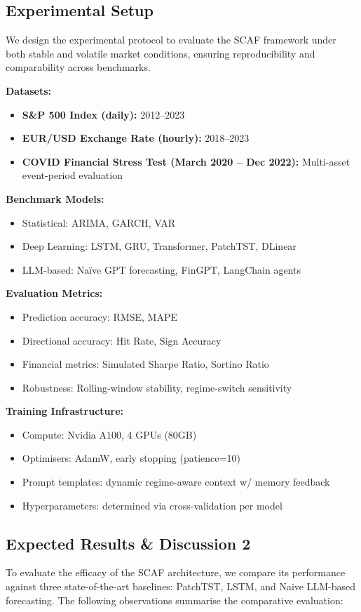\documentclass[conference]{IEEEtran}
\begin{document}
\subsection{Experimental Setup}
We design the experimental protocol to evaluate the SCAF framework under both stable and volatile market conditions, ensuring reproducibility and comparability across benchmarks.

\textbf{Datasets:}
\begin{itemize}
    \item \textbf{S\&P 500 Index (daily):} 2012–2023
    \item \textbf{EUR/USD Exchange Rate (hourly):} 2018–2023
    \item \textbf{COVID Financial Stress Test (March 2020 – Dec 2022):} Multi-asset event-period evaluation
\end{itemize}

\textbf{Benchmark Models:}
\begin{itemize}
    \item Statistical: ARIMA, GARCH, VAR
    \item Deep Learning: LSTM, GRU, Transformer, PatchTST, DLinear
    \item LLM-based: Naïve GPT forecasting, FinGPT, LangChain agents
\end{itemize}

\textbf{Evaluation Metrics:}
\begin{itemize}
    \item Prediction accuracy: RMSE, MAPE
    \item Directional accuracy: Hit Rate, Sign Accuracy
    \item Financial metrics: Simulated Sharpe Ratio, Sortino Ratio
    \item Robustness: Rolling-window stability, regime-switch sensitivity
\end{itemize}

\textbf{Training Infrastructure:}
\begin{itemize}
    \item Compute: Nvidia A100, 4 GPUs (80GB)
    \item Optimisers: AdamW, early stopping (patience=10)
    \item Prompt templates: dynamic regime-aware context w/ memory feedback
    \item Hyperparameters: determined via cross-validation per model
\end{itemize}


\subsection{Expected Results \& Discussion 2}
To evaluate the efficacy of the SCAF architecture, we compare its performance against three state-of-the-art baselines: PatchTST, LSTM, and Naive LLM-based forecasting. The following observations summarise the comparative evaluation:
\end{document}
